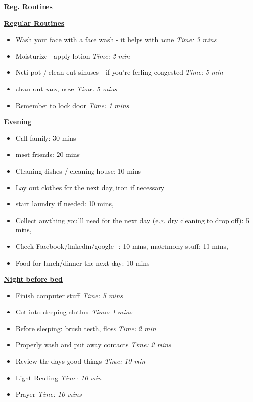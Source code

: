 \documentclass[serif,mathserif,final]{beamer}
\newcommand{\timeEst}[1]{\textit{Time:} \textit{#1}}
\begin{document}
\begin{frame}{}
\begin{columns}[t]
\begin{column}{0.27\linewidth} {\textbf{\underline{Reg. Routines}}}
\begin{block}{\small \textbf{\underline{Regular Routines}} }
\begin{itemize}
\item \tiny Wash your face with a face wash - it helps with acne \timeEst{3 mins}
\item \tiny Moisturize - apply lotion \timeEst{ 2 min}
\item \tiny Neti pot / clean out sinuses - if you’re feeling congested \timeEst{5 min}
\item \tiny clean out ears, nose \timeEst{5 mins}
\item \tiny Remember to lock door \timeEst{1 mins}
\end{itemize}

\underline{\textbf{Evening}}

\begin{itemize}
\item \tiny Call family: 30 mins
\item \tiny meet friends: 20 mins
\item \tiny Cleaning dishes / cleaning house: 10 mins
\item \tiny Lay out clothes for the next day, iron if necessary
\item \tiny start laundry if needed: 10 mins,
\item \tiny Collect anything you’ll need for the next day (e.g. dry cleaning to drop off): 5 mins,
\item \tiny Check Facebook/linkedin/google+: 10 mins, matrimony stuff: 10 mins,
\item \tiny Food for lunch/dinner the next day: 10 mins
\end{itemize}

\underline{\textbf{Night before bed}}
\begin{itemize}
\item \tiny Finish computer stuff \timeEst{5 mins}
\item \tiny Get into sleeping clothes \timeEst{1 mins}
\item \tiny Before sleeping: brush teeth, floss \timeEst{ 2 min}
\item \tiny Properly wash and put away contacts \timeEst{ 2 mins}
\item \tiny Review the days good things \timeEst{ 10 min}
\item \tiny Light Reading \timeEst{ 10 min}
\item \tiny Prayer \timeEst{10 mins}
\end{itemize}
\end{block}

\end{column}%

\end{columns} 

\end{frame} 
\end{document}

